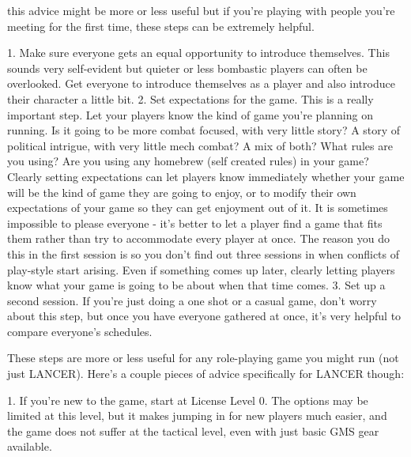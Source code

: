                                                                                                                 


this advice might be more or less useful but if you’re playing with people you’re meeting for the  
first time, these steps can be extremely helpful.
 

             1.  Make sure everyone gets an equal opportunity to introduce themselves. This  
                 sounds very self-evident but quieter or less bombastic players can often be  
                 overlooked. Get everyone to introduce themselves as a player and also introduce  
                 their character a little bit.  
             2.  Set expectations for the game. This is a really important step. Let your players  
                 know the kind of game you’re planning on running. Is it going to be more combat  
                 focused, with very little story? A story of political intrigue, with very little mech  
                 combat? A mix of both? What rules are you using? Are you using any homebrew  
                 (self created rules) in your game? Clearly setting expectations can let players  
                 know immediately whether your game will be the kind of game they are going to  
                 enjoy, or to modify their own expectations of your game so they can get  
                 enjoyment out of it. It is sometimes impossible to please everyone - it’s better to  
                 let a player find a game that fits them rather than try to accommodate every player  
                 at once. The reason you do this in the first session is so you don’t find out three  
                 sessions in when conflicts of play-style start arising. Even if something comes up  
                 later, clearly letting players know what your game is going to be about when that  
                 time comes.  
             3.  Set up a second session. If you’re just doing a one shot or a casual game, don’t  
                 worry about this step, but once you have everyone gathered at once, it’s very  
                 helpful to compare everyone’s schedules.  

These steps are more or less useful for any role-playing game you might run (not just LANCER).  
Here’s a couple pieces of advice specifically for LANCER though:
 

         	1. If you’re new to the game, start at License Level 0. The options may be limited at this  
         level, but it makes jumping in for new players much easier, and the game does not suffer  
         at the tactical level, even with just basic GMS gear available.
 
